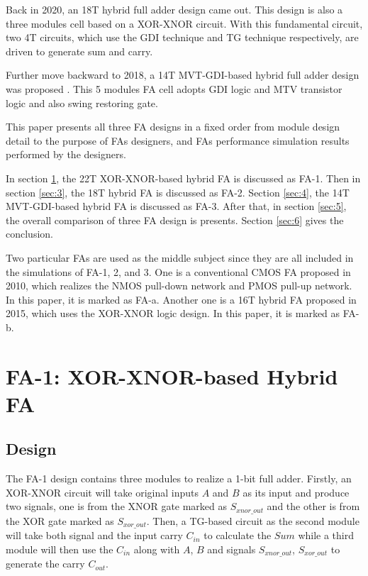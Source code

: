 \documentclass[conference]{IEEEtran}
\begin{document}
Back in 2020, an 18T hybrid full adder design \cite{9339799} came out.
This design is also a three modules cell based on a XOR-XNOR circuit.
With this fundamental circuit, two 4T circuits, which use the GDI technique and TG technique respectively, are driven to generate sum and carry.

Further move backward to 2018, a 14T MVT-GDI-based hybrid full adder design was proposed \cite{18743001}.
This 5 modules FA cell adopts GDI logic and MTV transistor logic and also swing restoring gate.

This paper presents all three FA designs in a fixed order
from module design detail to the purpose of FAs designers, and FAs performance simulation results performed by the designers.

In section \ref{sec:2}, the 22T XOR-XNOR-based hybrid FA is discussed as FA-1.
Then in section \ref{sec:3}, the 18T hybrid FA is discussed as FA-2.
Section \ref{sec:4}, the 14T MVT-GDI-based hybrid FA is discussed as FA-3.
After that, in section \ref{sec:5}, the overall comparison of three FA design is presents.
Section \ref{sec:6} gives the conclusion.

Two particular FAs are used as the middle subject since they are all included in the simulations of FA-1, 2, and 3.
One is a conventional CMOS FA proposed in 2010\cite{weste2010cmos}, which realizes the NMOS pull-down network and PMOS pull-up network.
In this paper, it is marked as FA-a.
Another one is a 16T hybrid FA proposed in 2015\cite{15484823}, which uses the XOR-XNOR logic design.
In this paper, it is marked as FA-b.


\section{FA-1: XOR-XNOR-based Hybrid FA}
\label{sec:2}

\subsection{Design}

The FA-1 \cite{20212210429416} design contains three modules to realize a 1-bit full adder.
Firstly, an XOR-XNOR circuit will take original inputs \(A\) and \(B\) as its input and produce two signals,
one is from the XNOR gate marked as \(S_{xnor\_out}\) and the other is from the XOR gate marked as \( S_{xor\_out}\).
Then, a TG-based circuit as the second module will take both signal and the input carry \(C_{in}\) to calculate the \(Sum\)
while a third module will then use the \(C_{in}\) along with \(A\), \(B\) and signals \(S_{xnor\_out}\), \( S_{xor\_out}\) to generate the carry \(C_{out}\).
\end{document}
